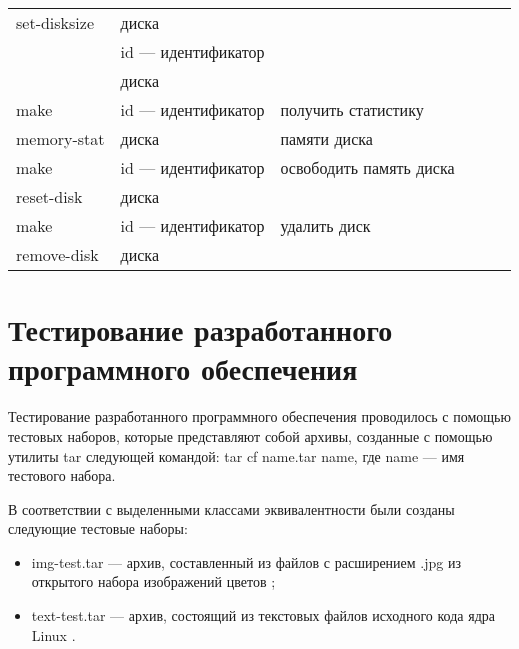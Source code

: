 \begin{table}[h]
\begin{center}
\begin{tabular}{|l|l|l|l|l|l|}
            \multicolumn{1}{|l}{set-disksize} & \multicolumn{1}{|l}{диска} & \multicolumn{1}{|l|}{} \\
            \multicolumn{1}{|l}{} & \multicolumn{1}{|l}{id --- идентификатор} & \multicolumn{1}{|l|}{} \\
            \multicolumn{1}{|l}{} & \multicolumn{1}{|l}{диска} & \multicolumn{1}{|l|}{} \\ \hline
            \multicolumn{1}{|l}{make} & \multicolumn{1}{|l}{id --- идентификатор} & \multicolumn{1}{|l|}{получить статистику} \\
            \multicolumn{1}{|l}{memory-stat} & \multicolumn{1}{|l}{диска} & \multicolumn{1}{|l|}{памяти диска} \\ \hline
            \multicolumn{1}{|l}{make} & \multicolumn{1}{|l}{id --- идентификатор} & \multicolumn{1}{|l|}{освободить память диска} \\
            \multicolumn{1}{|l}{reset-disk} & \multicolumn{1}{|l}{диска} & \multicolumn{1}{|l|}{} \\ \hline
            \multicolumn{1}{|l}{make} & \multicolumn{1}{|l}{id --- идентификатор} & \multicolumn{1}{|l|}{удалить диск} \\
            \multicolumn{1}{|l}{remove-disk} & \multicolumn{1}{|l}{диска} & \multicolumn{1}{|l|}{} \\ \hline
        \end{tabular}
    \end{center}
    \label{tab:comparison}
\end{table}

\section{Тестирование разработанного программного обеспечения}

Тестирование разработанного программного обеспечения проводилось с помощью тестовых наборов, которые представляют собой архивы, созданные с помощью утилиты tar \cite{tar} следующей командой: tar cf name.tar name, где name --- имя тестового набора. 

В соответствии с выделенными классами эквивалентности были созданы следующие тестовые наборы:

\begin{itemize}
    \item img-test.tar --- архив, составленный из файлов с расширением .jpg из открытого набора изображений цветов \cite{flowers-dataset};
    \item text-test.tar --- архив, состоящий из текстовых файлов исходного кода ядра Linux \cite{linux-code}.
\end{itemize}

